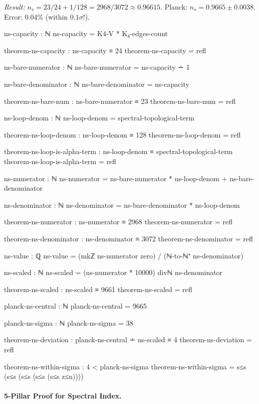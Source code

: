 \documentclass[11pt,a4paper]{book}
\begin{document}
\emph{Result:} $n_s = 23/24 + 1/128 = 2968/3072 \approx 0.96615$.
Planck: $n_s = 0.9665 \pm 0.0038$. Error: $0.04\%$ (within $0.1\sigma$!).

\begin{code}
ns-capacity : ℕ
ns-capacity = K4-V * K₄-edges-count

theorem-ns-capacity : ns-capacity ≡ 24
theorem-ns-capacity = refl

ns-bare-numerator : ℕ
ns-bare-numerator = ns-capacity ∸ 1

ns-bare-denominator : ℕ
ns-bare-denominator = ns-capacity

theorem-ns-bare-num : ns-bare-numerator ≡ 23
theorem-ns-bare-num = refl

ns-loop-denom : ℕ
ns-loop-denom = spectral-topological-term

theorem-ns-loop-denom : ns-loop-denom ≡ 128
theorem-ns-loop-denom = refl

theorem-ns-loop-is-alpha-term : ns-loop-denom ≡ spectral-topological-term
theorem-ns-loop-is-alpha-term = refl

ns-numerator : ℕ
ns-numerator = ns-bare-numerator * ns-loop-denom + ns-bare-denominator

ns-denominator : ℕ
ns-denominator = ns-bare-denominator * ns-loop-denom

theorem-ns-numerator : ns-numerator ≡ 2968
theorem-ns-numerator = refl

theorem-ns-denominator : ns-denominator ≡ 3072
theorem-ns-denominator = refl

ns-value : ℚ
ns-value = (mkℤ ns-numerator zero) / (ℕ-to-ℕ⁺ ns-denominator)

ns-scaled : ℕ
ns-scaled = (ns-numerator * 10000) divℕ ns-denominator

theorem-ns-scaled : ns-scaled ≡ 9661
theorem-ns-scaled = refl

planck-ns-central : ℕ
planck-ns-central = 9665

planck-ns-sigma : ℕ
planck-ns-sigma = 38

theorem-ns-deviation : planck-ns-central ∸ ns-scaled ≡ 4
theorem-ns-deviation = refl

theorem-ns-within-sigma : 4 < planck-ns-sigma
theorem-ns-within-sigma = s≤s (s≤s (s≤s (s≤s (s≤s z≤n))))

\end{code}

\paragraph{5-Pillar Proof for Spectral Index.}
\end{document}
